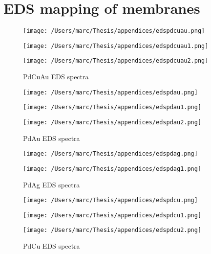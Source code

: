 \chapter{EDS mapping of membranes}
\begin{figure}[H]
  \texttt{[image: /Users/marc/Thesis/appendices/edspdcuau.png]}
\end{figure}

\begin{figure}[H]
  \texttt{[image: /Users/marc/Thesis/appendices/edspdcuau1.png]}
\end{figure}

\begin{figure}[H]
  \texttt{[image: /Users/marc/Thesis/appendices/edspdcuau2.png]}
  \caption{PdCuAu EDS spectra}
\end{figure}


\begin{figure}[H]
  \texttt{[image: /Users/marc/Thesis/appendices/edspdau.png]}
\end{figure}
\begin{figure}[H]
  \texttt{[image: /Users/marc/Thesis/appendices/edspdau1.png]}
\end{figure}

\begin{figure}[H]
  \texttt{[image: /Users/marc/Thesis/appendices/edspdau2.png]}
  \caption{PdAu EDS spectra}
\end{figure}

\begin{figure}[H]
  \texttt{[image: /Users/marc/Thesis/appendices/edspdag.png]}
\end{figure}

\begin{figure}[H]
  \texttt{[image: /Users/marc/Thesis/appendices/edspdag1.png]}
  \caption{PdAg EDS spectra}
\end{figure}

\begin{figure}[H]
  \texttt{[image: /Users/marc/Thesis/appendices/edspdcu.png]}
\end{figure}
\begin{figure}[H]
  \texttt{[image: /Users/marc/Thesis/appendices/edspdcu1.png]}
\end{figure}

\begin{figure}[H]
  \texttt{[image: /Users/marc/Thesis/appendices/edspdcu2.png]}
  \caption{PdCu EDS spectra}
\end{figure}

